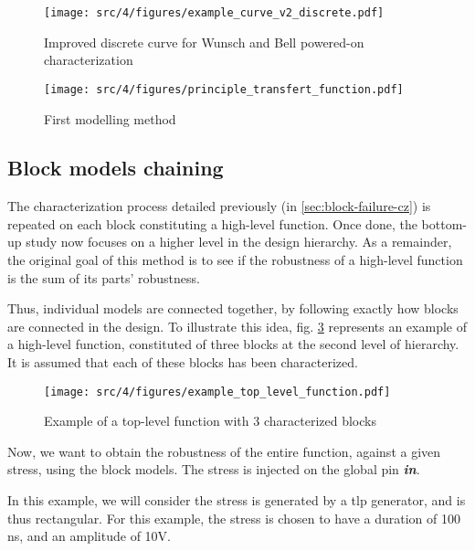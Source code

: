 \begin{figure}[!h]
  \centering
  \texttt{[image: src/4/figures/example\_curve\_v2\_discrete.pdf]}
  \caption{Improved discrete curve for Wunsch and Bell powered-on characterization}
  \label{wb_cz_curve_example_v2_discrete}
\end{figure}

\begin{figure}[!h]
  \centering
  \texttt{[image: src/4/figures/principle\_transfert\_function.pdf]}
  \caption{First modelling method}
  \label{fig:principle-transfert-func}
\end{figure}


\subsection{Block models chaining}
\label{sec:block-chaining}

The characterization process detailed previously (in \ref{sec:block-failure-cz}) is repeated on each block constituting a high-level function.
Once done, the bottom-up study now focuses on a higher level in the design hierarchy.
As a remainder, the original goal of this method is to see if the robustness of a high-level function is the sum of its parts' robustness.

Thus, individual models are connected together, by following exactly how blocks are connected in the design.
To illustrate this idea, fig. \ref{example_toplevel_function} represents an example of a high-level function, constituted of three blocks at the second level of hierarchy.
It is assumed that each of these blocks has been characterized.


\begin{figure}[!h]
  \centering
  \texttt{[image: src/4/figures/example\_top\_level\_function.pdf]}
  \caption{Example of a top-level function with 3 characterized blocks}
  \label{example_toplevel_function}
\end{figure}

Now, we want to obtain the robustness of the entire function, against a given stress, using the block models.
The stress is injected on the global pin \textbf{\textit{in}}.

In this example, we will consider the stress is generated by a \gls{tlp} generator, and is thus rectangular.
For this example, the stress is chosen to have a duration of 100 ns, and an amplitude of 10V.

